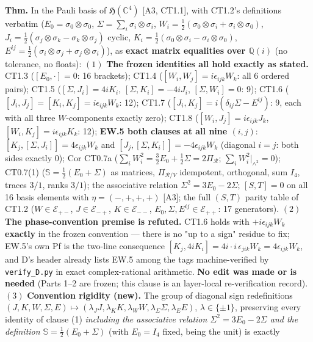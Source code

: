 \begin{theorem}\label{tag:FT-92}
\textbf{Thm.} In the Pauli basis of $\mathfrak H(\mathbb C^4)$ [A3, CT1.1], with CT1.2's definitions verbatim ($E_0=\sigma_0\otimes\sigma_0$, $\Sigma=\sum_i\sigma_i\otimes\sigma_i$, $W_i=\tfrac12(\sigma_0\otimes\sigma_i+\sigma_i\otimes\sigma_0)$, $J_i=\tfrac12(\sigma_j\otimes\sigma_k-\sigma_k\otimes\sigma_j)$ cyclic, $K_i=\tfrac12(\sigma_0\otimes\sigma_i-\sigma_i\otimes\sigma_0)$, $E^{ij}=\tfrac12(\sigma_i\otimes\sigma_j+\sigma_j\otimes\sigma_i)$), as \textbf{exact matrix equalities over $\mathbb Q(i)$} (no tolerance, no floats): $(1)$ \textbf{The frozen identities all hold exactly as stated.} CT1.3 ($[E_0,\cdot]=0$: 16 brackets); CT1.4 ($[W_i,W_j]=i\epsilon_{ijk}W_k$: all 6 ordered pairs); CT1.5 ($[\Sigma,J_i]=4iK_i$, $[\Sigma,K_i]=-4iJ_i$, $[\Sigma,W_i]=0$: 9); CT1.6 ($[J_i,J_j]=[K_i,K_j]=i\epsilon_{ijk}W_k$: 12); CT1.7 ($[J_i,K_j]=i(\delta_{ij}\Sigma-E^{ij})$: 9, each with all three $W$-components exactly zero); CT1.8 ($[W_i,J_j]=i\epsilon_{ijk}J_k$, $[W_i,K_j]=i\epsilon_{ijk}K_k$: 12); \textbf{EW.5 both clauses at all nine $(i,j)$}: $[K_j,[\Sigma,J_i]]=4\epsilon_{ijk}W_k$ and $[J_j,[\Sigma,K_i]]=-4\epsilon_{ijk}W_k$ (diagonal $i=j$: both sides exactly $0$); Cor CT0.7a ($\sum_iW_i^2=\tfrac32E_0+\tfrac12\Sigma=2\Pi_{\mathcal R}$; $\sum_iW_i^2|_{\wedge^2}=0$); CT0.7(1) ($\mathbb S=\tfrac12(E_0+\Sigma)$ as matrices, $\Pi_{\mathcal R/V}$ idempotent, orthogonal, sum $I_4$, traces $3/1$, ranks $3/1$); the associative relation $\Sigma^2=3E_0-2\Sigma$; $[S,T]=0$ on all 16 basis elements with $\eta=(-,+,+,+)$ [A3]; the full $(S,T)$ parity table of CT1.2 ($W\in\mathcal E_{+-}$, $J\in\mathcal E_{-+}$, $K\in\mathcal E_{--}$, $E_0,\Sigma,E^{ij}\in\mathcal E_{++}$: 17 generators). $(2)$ \textbf{The phase-convention premise is refuted.} CT1.6 holds with $+i\epsilon_{ijk}W_k$ \textbf{exactly} in the frozen convention — there is no "up to a sign" residue to fix; EW.5's own Pf is the two-line consequence $[K_j,4iK_i]=4i\cdot i\,\epsilon_{jik}W_k=4\epsilon_{ijk}W_k$, and D's header already lists EW.5 among the tags machine-verified by \texttt{verify\_\allowbreak{}D.py} in exact complex-rational arithmetic. \textbf{No edit was made or is needed} (Parts 1–2 are frozen; this clause is an layer-local re-verification record). $(3)$ \textbf{Convention rigidity (new).} The group of diagonal sign redefinitions $(J,K,W,\Sigma,E)\mapsto(\lambda_JJ,\lambda_KK,\lambda_WW,\lambda_\Sigma\Sigma,\lambda_EE)$, $\lambda\in\{\pm1\}$, preserving every identity of clause (1) \textit{including the associative relation $\Sigma^2=3E_0-2\Sigma$ and the definition $\mathbb S=\tfrac12(E_0+\Sigma)$} (with $E_0=I_4$ fixed, being the unit) is exactly


\end{theorem}
